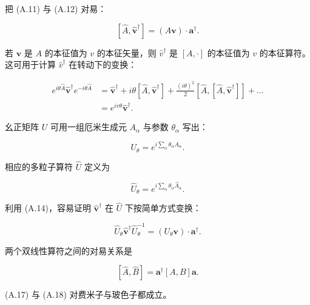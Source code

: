 把 (A.11) 与 (A.12) 对易：

\begin{equation*}
\left[ \hat {A}, \hat {\mathbf {v}} ^ {\dagger} \right] = \left( A \mathbf {v} \right) \cdot \mathbf {a} ^ {\dagger}.
\tag{A.13}
\end{equation*}

若 $\mathbf{v}$ 是 $A$ 的本征值为 $v$ 的本征矢量，则 $\hat{v}^{\dagger}$ 是 $[A,\cdot]$ 的本征值为 $v$ 的本征算符。这可用于计算 $\hat{v}^{\dagger}$ 在转动下的变换：

\begin{align*}
e ^ {i\theta \hat {A}} \hat {\mathbf {v}} ^ {\dagger} e ^ {-i\theta \hat {A}} & = \hat {\mathbf {v}} ^ {\dagger} + i\theta \left[ \hat {A}, \hat {\mathbf {v}} ^ {\dagger} \right] + \frac {( i\theta ) ^ {2}}{2} \left[ \hat {A}, \left[ \hat {A}, \hat {\mathbf {v}} ^ {\dagger} \right] \right] + \dots\\
& = e ^ {iv\theta} \hat {\mathbf {v}} ^ {\dagger} .
\tag{A.14}
\end{align*}

幺正矩阵 $U$ 可用一组厄米生成元 $A_{\alpha}$ 与参数 $\theta_{\alpha}$ 写出：

\begin{equation*}
U _ {\theta} = e ^ {i \sum_ {\alpha} \theta_{\alpha} A_{\alpha}}.
\tag{A.15}
\end{equation*}

相应的多粒子算符 $\hat{U}$ 定义为

\begin{equation*}
\hat {U} _ {\theta} = e ^ {i \sum_ {\alpha} \theta_{\alpha} \hat {A}_{\alpha}}.
\tag{A.16}
\end{equation*}

利用 (A.14)，容易证明 $\hat{\mathbf{v}}^{\dagger}$ 在 $\hat{U}$ 下按简单方式变换：

\begin{equation*}
\hat {U} _ {\theta} \hat {\mathbf {v}} ^ {\dagger} \hat {U} _ {\theta} ^ {- 1} = \left( U _ {\theta} \mathbf {v} \right) \cdot \mathbf {a} ^ {\dagger}.
\tag{A.17}
\end{equation*}

两个双线性算符之间的对易关系是

\begin{equation*}
\left[ \hat {A}, \hat {B} \right] = \mathbf {a} ^ {\dagger} [ A, B ] \mathbf {a}.
\tag{A.18}
\end{equation*}

(A.17) 与 (A.18) 对费米子与玻色子都成立。

